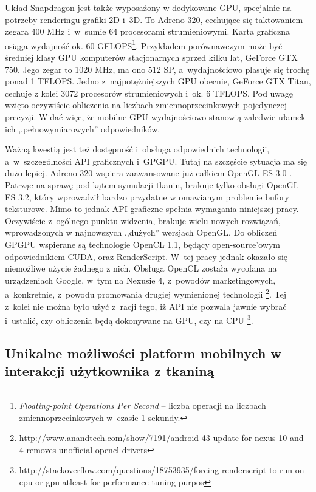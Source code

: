 		Układ Snapdragon jest także wyposażony w dedykowane GPU, specjalnie na potrzeby renderingu grafiki 2D i~3D. To Adreno 320, cechujące się taktowaniem zegara 400 MHz i~w~sumie 64 procesorami strumieniowymi. Karta graficzna osiąga wydajność ok. 60 GFLOPS\footnote{\emph{Floating-point Operations Per Second} -- liczba operacji na liczbach zmiennoprzecinkowych w~czasie 1 sekundy.}. Przykładem porównawczym może być średniej klasy GPU komputerów stacjonarnych sprzed kilku lat, GeForce GTX 750. Jego zegar to 1020 MHz, ma ono 512 SP, a~wydajnościowo plasuje się trochę ponad 1 TFLOPS. Jedno z~najpotężniejszych GPU obecnie, GeForce GTX Titan, cechuje z kolei 3072 procesorów strumieniowych i~ok. 6 TFLOPS. Pod uwagę wzięto oczywiście obliczenia na liczbach zmiennoprzecinkowych pojedynczej precyzji. Widać więc, że mobilne GPU wydajnościowo stanowią zaledwie ułamek ich ,,pełnowymiarowych'' odpowiedników.
		
		Ważną kwestią jest też dostępność i~obsługa odpowiednich technologii, a~w~szczególności API graficznych i~GPGPU. Tutaj na szczęście sytuacja ma się dużo lepiej. Adreno 320 wspiera zaawansowane już całkiem OpenGL ES 3.0 \cite{specs_adreno}. Patrząc na sprawę pod kątem symulacji tkanin, brakuje tylko obsługi OpenGL ES 3.2, który wprowadził bardzo przydatne w omawianym problemie bufory teksturowe. Mimo to jednak API graficzne spełnia wymagania niniejszej pracy. Oczywiście z~ogólnego punktu widzenia, brakuje wielu nowych rozwiązań, wprowadzonych w najnowszych ,,dużych'' wersjach OpenGL. Do obliczeń GPGPU wspierane są technologie OpenCL 1.1, będący open-source'owym odpowiednikiem CUDA, oraz RenderScript. W~tej pracy jednak okazało się niemożliwe użycie żadnego z nich. Obsługa OpenCL została wycofana na urządzeniach Google, w~tym na Nexusie 4, z~powodów marketingowych, a~konkretnie, z~powodu promowania drugiej wymienionej technologii \footnote{http://www.anandtech.com/show/7191/android-43-update-for-nexus-10-and-4-removes-unofficial\allowbreak-opencl-drivers}. Tej z~kolei nie można było użyć z~racji tego, iż API nie pozwala jawnie wybrać i~ustalić, czy obliczenia będą dokonywane na GPU, czy na CPU \footnote{http://stackoverflow.com/questions/18753935/forcing-renderscript-to-run-on-cpu-or-gpu-atleast\allowbreak-for-performance-tuning-purpos}.
		
		\subsection{Unikalne możliwości platform mobilnych w interakcji użytkownika z tkaniną}
		\label{t:technologie:mobilne:interakcja}
		

